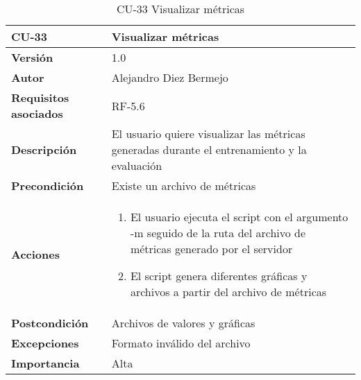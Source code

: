 \begin{table}[p]
	\centering
	\begin{tabularx}{\linewidth}{ p{} p{} }
		\toprule
		\textbf{CU-33}    & \textbf{Visualizar métricas}\\
		\toprule
		\textbf{Versión}              & 1.0    \\
		\textbf{Autor}                & Alejandro Diez Bermejo \\
		\textbf{Requisitos asociados} & RF-5.6 \\
		\textbf{Descripción}          & El usuario quiere visualizar las métricas generadas durante el entrenamiento y la evaluación \\
        \textbf{Precondición}         & Existe un archivo de métricas \\
		\textbf{Acciones}             &
		\begin{enumerate}
			\def\labelenumi{\arabic{enumi}.}
			\tightlist
            \item El usuario ejecuta el script con el argumento -m seguido de la ruta del archivo de métricas generado por el servidor
            \item El script genera diferentes gráficas y archivos a partir del archivo de métricas
		\end{enumerate}\\
		\textbf{Postcondición}        & Archivos de valores y gráficas \\
		\textbf{Excepciones}          & Formato inválido del archivo \\
		\textbf{Importancia}          & Alta \\
		\bottomrule
	\end{tabularx}
	\caption{CU-33 Visualizar métricas}
\end{table}
